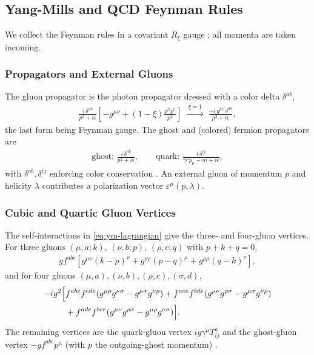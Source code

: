 \subsection{Yang-Mills and QCD Feynman Rules}
\label{sec:qcd-feymann-rules}

We collect the Feynman rules in a covariant $R_\xi$ gauge \autocite[\S26.1]{schwartzQFT2014}; all momenta are taken incoming.

\subsubsection{Propagators and External Gluons}
\label{subsubsec:propagators-and-external-gluons}

The gluon propagator is the photon propagator dressed with a color delta $\delta^{ab}$,
\begin{align}
    \label{eq:gluon-propagator}
    \frac{i\,\delta^{ab}}{p^2 + i\epsilon}\left[-g^{\mu\nu} + (1-\xi)\frac{p^\mu p^\nu}{p^2}\right]
    \;\xrightarrow{\;\xi = 1\;}\;
    \frac{-i\, g^{\mu\nu}\,\delta^{ab}}{p^2 + i\epsilon}
    ,
\end{align}
the last form being Feynman gauge. The ghost and (colored) fermion propagators are
\begin{align}
    \text{ghost: } \frac{i\,\delta^{ab}}{p^2 + i\epsilon},
    \qquad
    \text{quark: } \frac{i\,\delta^{ij}}{\gamma^\mu p_\mu - m + i\epsilon},
\end{align}
with $\delta^{ab}, \delta^{ij}$ enforcing color conservation \autocite[(26.4--26.6)]{schwartzQFT2014}. An external gluon of momentum $p$ and helicity $\lambda$ contributes a polarization vector $\varepsilon^\mu(p, \lambda)$.

\subsubsection{Cubic and Quartic Gluon Vertices}
\label{subsubsec:cubic-and-quartic-gluon-vertices}

The self-interactions in \eqref{eq:ym-lagrangian} give the three- and four-gluon vertices. For three gluons $(\mu,a;k)$, $(\nu,b;p)$, $(\rho,c;q)$ with $p + k + q = 0$,
\begin{align}
    \label{eq:three-gluon-vertex}
    g f^{abc}\left[g^{\mu\nu}(k - p)^\rho + g^{\nu\rho}(p - q)^\mu + g^{\rho\mu}(q - k)^\nu\right],
\end{align}
and for four gluons $(\mu,a),(\nu,b),(\rho,c),(\sigma,d)$,
\begin{align}
    \label{eq:four-gluon-vertex}
    -i g^2\Big[
    &f^{abe}f^{cde}(g^{\mu\rho}g^{\nu\sigma} - g^{\mu\sigma}g^{\nu\rho})
    + f^{ace}f^{bde}(g^{\mu\nu}g^{\rho\sigma} - g^{\mu\sigma}g^{\nu\rho}) \notag\\
    &+ f^{ade}f^{bce}(g^{\mu\nu}g^{\rho\sigma} - g^{\mu\rho}g^{\nu\sigma})
    \Big]
    .
\end{align}
The remaining vertices are the quark-gluon vertex $i g \gamma^\mu T^a_{ij}$ and the ghost-gluon vertex $-g f^{abc} p^\mu$ (with $p$ the outgoing-ghost momentum) \autocite[(26.9--26.12)]{schwartzQFT2014}.

